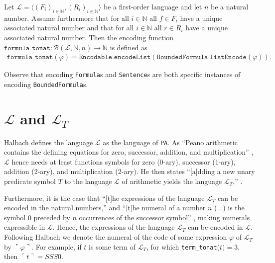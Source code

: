 \begin{definition}\label{def:coding-ttn}
    Let $\mathcal{L} = \langle (F_i)_{i \in \mathbb{N}}, (R_i)_{i \in \mathbb{N}} \rangle$ be a first-order language and let $n$ be a natural number. Assume furthermore that for all $i \in \mathbb{N}$ all $f \in F_i$ have a unique associated natural number and that for all $i \in \mathbb{N}$ all $r \in R_i$ have a unique associated natural number. Then the encoding function $\texttt{formula\_tonat} : \mathcal{B}(\mathcal{L},\mathbb{N},n) \to \mathbb{N}$ is defined as 
    \begin{align*}
        \texttt{formula\_tonat}(\varphi) = \texttt{Encodable.encodeList}(\texttt{BoundedFormula.listEncode}(\varphi)).
    \end{align*}
\end{definition}

Observe that encoding \texttt{Formula}s and \texttt{Sentence}s are both specific instances of encoding \texttt{BoundedFormula}s.

\section{$\mathcal{L}$ and $\mathcal{L}_T$}\label{subsec:lpa-lt}
Halbach defines the language $\mathcal{L}$ as the language of \texttt{PA}. As ``Peano arithmetic contains the defining equations for zero, successor, addition, and multiplication'' \cite[p. 30]{halbach:2011}, $\mathcal{L}$ hence needs at least functions symbols for zero (0-ary), successor (1-ary), addition (2-ary), and multiplication (2-ary). He then states ``[a]dding a new unary predicate symbol $T$ to the language $\mathcal{L}$ of arithmetic yields the language $\mathcal{L}_T$,'' \cite[p. 31]{halbach:2011}.

Furthermore, it is the case that ``[t]he expressions of the language $\mathcal{L}_T$ can be encoded in the natural numbers,'' and ``[t]he numeral of a number $n$ (...) is the symbol 0 preceded by $n$ occurrences of the successor symbol'' \cite[p. 31]{halbach:2011}, making numerals expressible in $\mathcal{L}$. Hence, the expressions of the language $\mathcal{L}_T$ can be encoded in $\mathcal{L}$. Following Halbach we denote the numeral of the code of some expression $\varphi$ of $\mathcal{L}_T$ by $\ulcorner \varphi \urcorner$. For example, if $t$ is some term of $\mathcal{L}_T$, for which \texttt{term\_tonat}($t) = 3$, then $\ulcorner t \urcorner = SSS0$.

